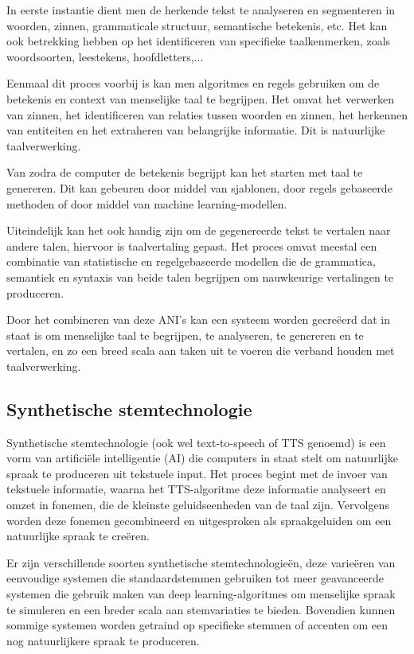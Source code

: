 In eerste instantie dient men de herkende tekst te analyseren en segmenteren in woorden, zinnen, grammaticale structuur, semantische betekenis, etc. Het kan ook betrekking hebben op het identificeren van specifieke taalkenmerken, zoals woordsoorten, leestekens, hoofdletters,...

Eenmaal dit proces voorbij is kan men algoritmes en regels gebruiken om de betekenis en context van menselijke taal te begrijpen. Het omvat het verwerken van zinnen, het identificeren van relaties tussen woorden en zinnen, het herkennen van entiteiten en het extraheren van belangrijke informatie. Dit is natuurlijke taalverwerking.

Van zodra de computer de betekenis begrijpt kan het starten met taal te genereren. Dit kan gebeuren door middel van sjablonen, door regels gebaseerde methoden of door middel van machine learning-modellen.

Uiteindelijk kan het ook handig zijn om de gegenereerde tekst te vertalen naar andere talen, hiervoor is taalvertaling gepast. Het proces omvat meestal een combinatie van statistische en regelgebaseerde modellen die de grammatica, semantiek en syntaxis van beide talen begrijpen om nauwkeurige vertalingen te produceren.

Door het combineren van deze ANI's kan een systeem worden gecreëerd dat in staat is om menselijke taal te begrijpen, te analyseren, te genereren en te vertalen, en zo een breed scala aan taken uit te voeren die verband houden met taalverwerking.

\subsection{Synthetische stemtechnologie}

Synthetische stemtechnologie (ook wel text-to-speech of TTS genoemd) is een vorm van artificiële intelligentie (AI) die computers in staat stelt om natuurlijke spraak te produceren uit tekstuele input. Het proces begint met de invoer van tekstuele informatie, waarna het TTS-algoritme deze informatie analyseert en omzet in fonemen, die de kleinste geluidseenheden van de taal zijn. Vervolgens worden deze fonemen gecombineerd en uitgesproken als spraakgeluiden om een natuurlijke spraak te creëren.

Er zijn verschillende soorten synthetische stemtechnologieën, deze varieëren van eenvoudige systemen die standaardstemmen gebruiken tot meer geavanceerde systemen die gebruik maken van deep learning-algoritmes om menselijke spraak te simuleren en een breder scala aan stemvariaties te bieden. Bovendien kunnen sommige systemen worden getraind op specifieke stemmen of accenten om een nog natuurlijkere spraak te produceren.

